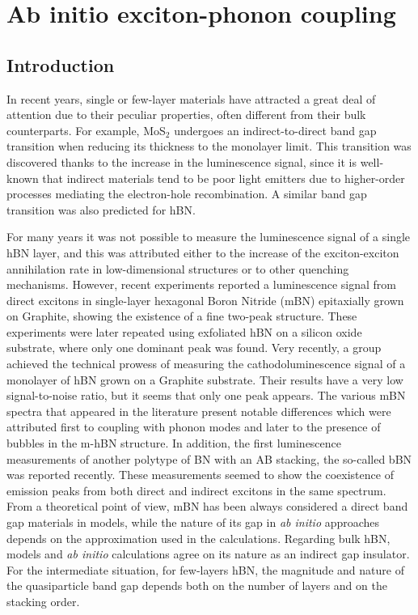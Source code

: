 \chapter{Ab initio exciton-phonon coupling}
\chaptertoc{}

%
\section{Introduction}
In recent years, single or few-layer materials have attracted a great deal of attention due to their peculiar properties, often different from their bulk counterparts. For example, MoS$_2$ undergoes an indirect-to-direct band gap transition when reducing its thickness to the monolayer limit.\cite{Splendidiani_2010,Mak_2010}
This transition was discovered thanks to the increase in the luminescence signal, since it is well-known that indirect materials tend to be poor light emitters due to higher-order processes mediating the electron-hole recombination.
A similar band gap transition was also predicted for \acrshort{hBN}.\cite{paleari2018excitons}

For many years it was not possible to measure the luminescence signal of a single hBN layer,\cite{schue2016dimensionality} and this was attributed either to the increase of the exciton-exciton annihilation rate in low-dimensional structures\cite{yuan2015exciton,plaud2019exciton} or to other quenching mechanisms.
However, recent experiments reported a luminescence signal from direct excitons in single-layer hexagonal Boron Nitride (mBN) epitaxially grown on Graphite, showing the existence of a fine two-peak structure.\cite{elias2019direct,wang2022scalable} These experiments were later repeated using exfoliated hBN on a silicon oxide substrate,\cite{rousseau2021monolayer} where only one dominant peak was found. Very recently, a group achieved the technical prowess of measuring the cathodoluminescence signal of a monolayer of hBN grown on a Graphite substrate.\cite{shima2023cathodoluminescence} Their results have a very low signal-to-noise ratio, but it seems that only one peak appears.
The various mBN spectra that appeared in the literature present notable differences which were attributed first to coupling with phonon modes and later to the presence of bubbles in the m-hBN structure.
In addition, the first luminescence measurements of another polytype of BN with an AB stacking, the so-called \acrfull{bBN} was reported recently.\cite{rousseau2022bernal, rousseau2022phonon}
These measurements seemed to show the coexistence of emission peaks from both direct and indirect excitons in the same spectrum.
From a theoretical point of view, mBN has been always considered a direct band gap materials in models\cite{galvani2016excitons}, while the nature of its gap in \emph{ab initio} approaches depends on the approximation used in the calculations.\cite{prete2020giant,mengle2019impact} Regarding bulk hBN, models and \emph{ab initio} calculations agree on its nature as an indirect gap insulator.\cite{sponza2018direct}
For the intermediate situation, for few-layers hBN, the magnitude and nature of the quasiparticle band gap depends both on the number of layers and on the stacking order.\cite{sponza2018direct,mengle2019impact,latil2022electronic}

